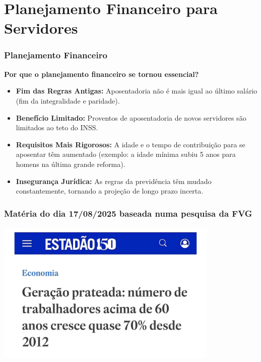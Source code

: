 \section{Planejamento Financeiro para Servidores}

\begin{frame}[c]\frametitle{Planejamento Financeiro}
  \textbf{Por que o planejamento financeiro se tornou essencial?}
  \begin{itemize}
    \item \textbf{Fim das Regras Antigas:} Aposentadoria não é mais igual ao último salário (fim da integralidade e paridade).
    \item \textbf{Benefício Limitado:} Proventos de aposentadoria de novos servidores são limitados ao teto do INSS.
    \item \textbf{Requisitos Mais Rigorosos:} A idade e o tempo de contribuição para se aposentar têm aumentado (exemplo: a idade mínima subiu 5 anos para homens na última grande reforma).
    \item \textbf{Insegurança Jurídica:} As regras da previdência têm mudado constantemente, tornando a projeção de longo prazo incerta.
  \end{itemize}
\end{frame}

\begin{frame}[t]\frametitle{Matéria do dia 17/08/2025 baseada numa pesquisa da FVG}

  \begin{center}
    \includegraphics[width=0.8\textwidth]{../figuras/geracao_prateada.jpeg}
  \end{center}

\end{frame}

